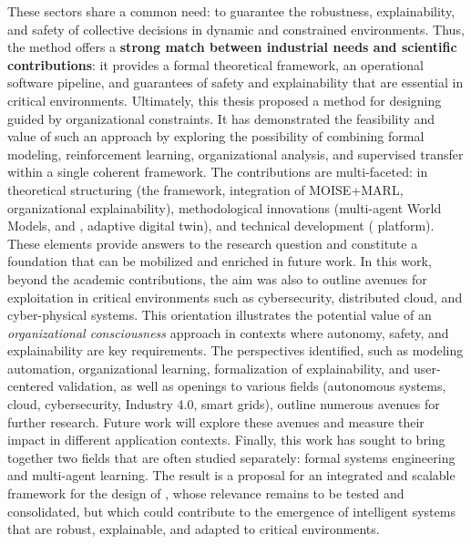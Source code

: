 These sectors share a common need: to guarantee the robustness, explainability, and safety of collective decisions in dynamic and constrained environments.
\medskip
\noindent
Thus, the  method offers a \textbf{strong match between industrial needs and scientific contributions}:
it provides a formal theoretical framework, an operational software pipeline, and guarantees of safety and explainability that are essential in critical environments.
\medskip
\noindent
Ultimately, this thesis proposed a method for designing  guided by organizational constraints.
It has demonstrated the feasibility and value of such an approach by exploring the possibility of combining formal modeling, reinforcement learning, organizational analysis, and supervised transfer within a single coherent framework.
\medskip
\noindent
The contributions are multi-faceted: in theoretical structuring (the  framework, integration of MOISE+MARL, organizational explainability), methodological innovations (multi-agent World Models,  and , adaptive digital twin), and technical development ( platform).
These elements provide answers to the research question and constitute a foundation that can be mobilized and enriched in future work.
\medskip
\noindent
In this work, beyond the academic contributions, the aim was also to outline avenues for exploitation in critical environments such as cybersecurity, distributed cloud, and cyber-physical systems.
This orientation illustrates the potential value of an \textit{organizational consciousness} approach in contexts where autonomy, safety, and explainability are key requirements.
\medskip
\noindent
The perspectives identified, such as modeling automation, organizational learning, formalization of explainability, and user-centered validation, as well as openings to various fields (autonomous systems, cloud, cybersecurity, Industry 4.0, smart grids), outline numerous avenues for further research.
Future work will explore these avenues and measure their impact in different application contexts.
\medskip
\noindent
Finally, this work has sought to bring together two fields that are often studied separately: formal systems engineering and multi-agent learning.
The result is a proposal for an integrated and scalable framework for the design of , whose relevance remains to be tested and consolidated, but which could contribute to the emergence of intelligent systems that are robust, explainable, and adapted to critical environments.

\clearpage
\thispagestyle{empty}
\null
\newpage
